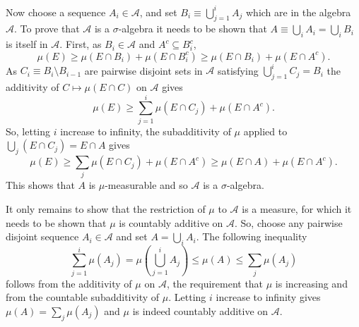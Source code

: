 \documentclass[12pt]{article}
\begin{document}
Now choose a sequence $A_i\in\mathcal{A}$, and set $B_i\equiv\bigcup_{j=1}^{i}A_j$ which are in the algebra $\mathcal{A}$. To prove that $\mathcal{A}$ is a $\sigma$-algebra it needs to be shown that $A\equiv\bigcup_iA_i=\bigcup_iB_i$ is itself in $\mathcal{A}$.
First, as $B_i\in\mathcal{A}$ and $A^c\subseteq B_i^c$,
\begin{equation*}
\mu(E)\ge\mu(E\cap B_i)+\mu(E\cap B_i^c)\ge\mu(E\cap B_i)+\mu(E\cap A^c).
\end{equation*}
As $C_i\equiv B_i\setminus B_{i-1}$ are pairwise disjoint sets in $\mathcal{A}$ satisfying $\bigcup_{j=1}^i C_j=B_i$ the additivity of $C\mapsto\mu(E\cap C)$ on $\mathcal{A}$ gives
\begin{equation*}
\mu(E)\ge\sum_{j=1}^i\mu(E\cap C_j)+\mu(E\cap A^c).
\end{equation*}
So, letting $i$ increase to infinity, the subadditivity of $\mu$ applied to $\bigcup_j(E\cap C_j)=E\cap A$ gives
\begin{equation*}
\mu(E)\ge\sum_j\mu(E\cap C_j)+\mu(E\cap A^c)\ge\mu(E\cap A)+\mu(E\cap A^c).
\end{equation*}
This shows that $A$ is $\mu$-measurable and so $\mathcal{A}$ is a $\sigma$-algebra.

It only remains to show that the restriction of $\mu$ to $\mathcal{A}$ is a measure, for which it needs to be shown that $\mu$ is countably additive on $\mathcal{A}$. So, choose any pairwise disjoint sequence $A_i\in\mathcal{A}$ and set $A=\bigcup_iA_i$. The following inequality
\begin{equation*}
\sum_{j=1}^i\mu(A_j)=\mu\left(\bigcup_{j=1}^iA_j\right)\le\mu(A)\le\sum_j\mu(A_j)
\end{equation*}
follows from the additivity of $\mu$ on $\mathcal{A}$, the requirement that $\mu$ is increasing and from the countable subadditivity of $\mu$. Letting $i$ increase to infinity gives $\mu(A)=\sum_j\mu(A_j)$ and $\mu$ is indeed countably additive on $\mathcal{A}$.

\end{document}
